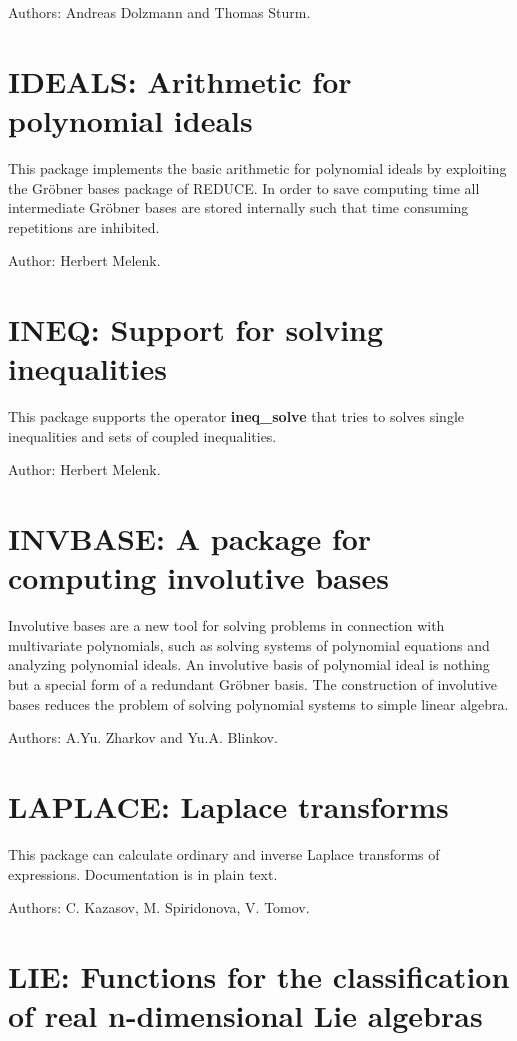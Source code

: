 Authors: Andreas Dolzmann and Thomas Sturm.

\section{IDEALS: Arithmetic for polynomial ideals} 

This package implements the basic arithmetic for polynomial ideals by
exploiting the Gr\"obner bases package of REDUCE.  In order to save
computing time all intermediate Gr\"obner bases are stored internally such
that time consuming repetitions are inhibited.

Author: Herbert Melenk.

\section{INEQ: Support for solving inequalities} 

This package supports the operator {\bf ineq\_solve} that 
tries to solves single inequalities and sets of coupled inequalities.

Author: Herbert Melenk.

\section{INVBASE: A package for computing involutive bases} 

Involutive bases are a new tool for solving problems in connection with
multivariate polynomials, such as solving systems of polynomial equations
and analyzing polynomial ideals.  An involutive basis of polynomial ideal
is nothing but a special form of a redundant Gr\"obner basis.  The
construction of involutive bases reduces the problem of solving polynomial
systems to simple linear algebra.

Authors: A.Yu. Zharkov and Yu.A. Blinkov.

\section{LAPLACE: Laplace transforms} 

This package can calculate ordinary and inverse Laplace transforms of
expressions.  Documentation is in plain text.

Authors: C. Kazasov, M. Spiridonova, V. Tomov.

\section{LIE: Functions for the classification of real n-dimensional Lie
algebras}

